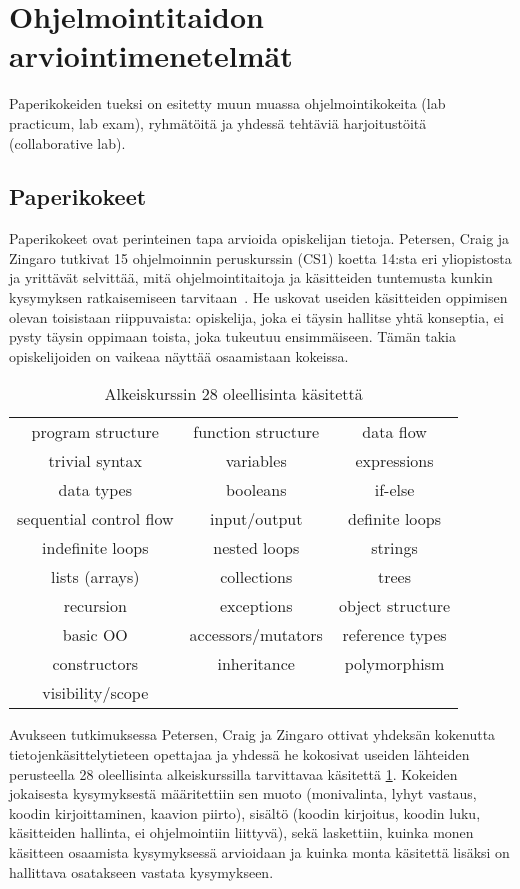 \documentclass[finnish]{../tktltiki2}
\theoremstyle{definition}
\theoremstyle{remark}
\begin{document}
\section{Ohjelmointitaidon arviointimenetelmät}

Paperikokeiden tueksi on esitetty muun muassa ohjelmointikokeita (lab practicum, lab exam), ryhmätöitä ja yhdessä tehtäviä harjoitustöitä (collaborative lab).

\subsection{Paperikokeet}

Paperikokeet ovat perinteinen tapa arvioida opiskelijan tietoja. Petersen, Craig ja Zingaro tutkivat 15 ohjelmoinnin peruskurssin (CS1) koetta 14:sta eri yliopistosta ja yrittävät selvittää, mitä ohjelmointitaitoja ja käsitteiden tuntemusta kunkin kysymyksen ratkaisemiseen tarvitaan~\cite{PCZ11}. He uskovat useiden käsitteiden oppimisen olevan toisistaan riippuvaista: opiskelija, joka ei täysin hallitse yhtä konseptia, ei pysty täysin oppimaan toista, joka tukeutuu ensimmäiseen. Tämän takia opiskelijoiden on vaikeaa näyttää osaamistaan kokeissa.

\begin{table}
  \begin{tabular}{ c c c }
    program structure & function structure & data flow \\
    trivial syntax & variables & expressions \\
    data types & booleans & if-else \\
    sequential control flow & input/output & definite loops \\
    indefinite loops & nested loops & strings \\
    lists (arrays) & collections & trees \\
    recursion & exceptions & object structure \\
    basic OO & accessors/mutators & reference types \\
    constructors & inheritance & polymorphism \\
    visibility/scope \\
  \end{tabular}
\caption{Alkeiskurssin 28 oleellisinta käsitettä}
\label{tab:kasitteet}
\end{table}

Avukseen tutkimuksessa Petersen, Craig ja Zingaro ottivat yhdeksän kokenutta tietojenkäsittelytieteen opettajaa ja yhdessä he kokosivat useiden lähteiden perusteella 28 oleellisinta alkeiskurssilla tarvittavaa käsitettä \ref{tab:kasitteet}. Kokeiden jokaisesta kysymyksestä määritettiin sen muoto (monivalinta, lyhyt vastaus, koodin kirjoittaminen, kaavion piirto), sisältö (koodin kirjoitus, koodin luku, käsitteiden hallinta, ei ohjelmointiin liittyvä), sekä laskettiin, kuinka monen käsitteen osaamista kysymyksessä arvioidaan ja kuinka monta käsitettä lisäksi on hallittava osatakseen vastata kysymykseen.
\end{document}
